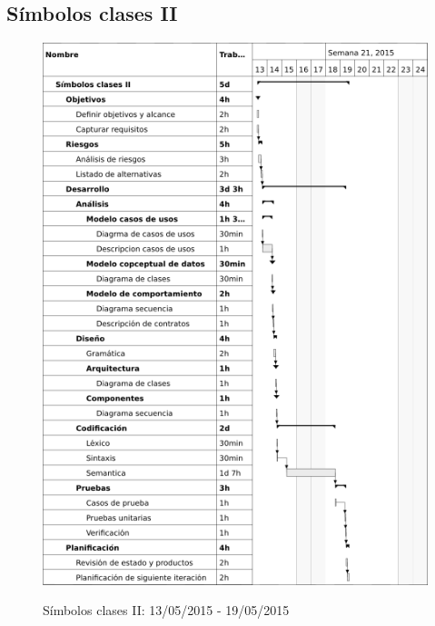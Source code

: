 \subsection{Símbolos clases II}
\begin{center}
\begin{figure}[H]
\centering
\includegraphics[scale=1]{planning/28-simbolos-clases-ii.png} \\
\caption{Símbolos clases II: 13/05/2015 - 19/05/2015 }
\end{figure}
\end{center}



